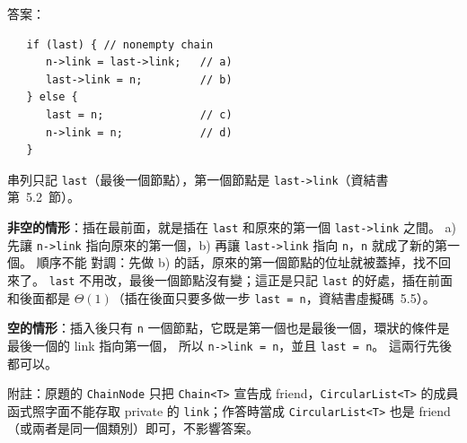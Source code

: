 \begin{pastsoln}
答案：
\begin{verbatim}
   if (last) { // nonempty chain
      n->link = last->link;   // a)
      last->link = n;         // b)
   } else {
      last = n;               // c)
      n->link = n;            // d)
   }
\end{verbatim}

串列只記 \texttt{last}（最後一個節點），第一個節點是 \texttt{last->link}（資結書第~5.2~節）。

\textbf{非空的情形}：插在最前面，就是插在 \texttt{last} 和原來的第一個 \texttt{last->link} 之間。 a) 先讓
\texttt{n->link} 指向原來的第一個，b) 再讓 \texttt{last->link} 指向 \texttt{n}，\texttt{n} 就成了新的第一個。 順序不能
對調：先做 b) 的話，原來的第一個節點的位址就被蓋掉，找不回來了。 \texttt{last} 不用改，最後一個節點沒有變；這正是只記
\texttt{last} 的好處，插在前面和後面都是 $\Theta(1)$（插在後面只要多做一步 \texttt{last = n}，資結書虛擬碼~5.5）。

\textbf{空的情形}：插入後只有 \texttt{n} 一個節點，它既是第一個也是最後一個，環狀的條件是最後一個的 link 指向第一個，
所以 \texttt{n->link = n}，並且 \texttt{last = n}。 這兩行先後都可以。

附註：原題的 \texttt{ChainNode} 只把 \texttt{Chain<T>} 宣告成 friend，\texttt{CircularList<T>} 的成員函式照字面不能存取
private 的 \texttt{link}；作答時當成 \texttt{CircularList<T>} 也是 friend（或兩者是同一個類別）即可，不影響答案。
\end{pastsoln}
